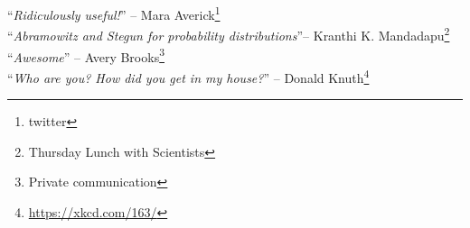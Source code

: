 \normalstretch
~\\~\\

\noindent
``\emph{Ridiculously useful!}'' -- Mara Averick\footnote{twitter}%
\\



\noindent
``\emph{Abramowitz and Stegun for probability distributions}''-- Kranthi K. Mandadapu\footnote{Thursday Lunch with Scientists}
\\


\noindent
``\emph{Awesome}'' -- Avery Brooks\footnote{Private communication}
\\



\noindent
``\emph{Who are you? How did you get in my house?}'' -- Donald Knuth\footnote{\url{https://xkcd.com/163/}}
\\

